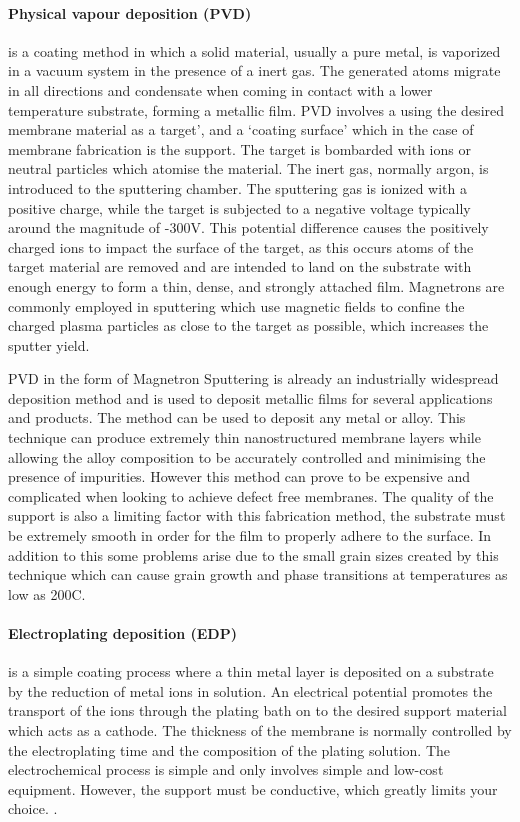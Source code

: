 \paragraph*{Physical vapour deposition (PVD)} is a coating method in which a solid material, usually a pure metal, is vaporized in a vacuum system in the presence of a inert gas. The generated atoms migrate in all directions and condensate when coming in contact with a lower temperature substrate,  forming a metallic film. PVD involves a using the desired membrane material as a target’, and a ‘coating surface’ which in the case of membrane fabrication is the support. \cite{Peters2015a} The target is bombarded with ions or neutral particles which atomise the material. The inert gas, normally argon, is introduced to the sputtering chamber. The sputtering gas is ionized with a positive charge, while the target is subjected to a negative voltage typically around the magnitude of -300V. This potential difference causes the positively charged ions to impact the surface of the target, as this occurs atoms of the target material are removed and are intended to land on the substrate with enough energy to form a thin, dense, and strongly attached film. Magnetrons are commonly employed in sputtering which use magnetic fields to confine the charged plasma particles as close to the target as possible, which increases the sputter yield. 

PVD in the form of Magnetron Sputtering is already an industrially widespread deposition method and is used to deposit metallic films for several applications and products. \cite{Peters2015a} The method can be used to deposit any metal or alloy. This technique can produce extremely thin nanostructured membrane layers while allowing the alloy composition to be accurately controlled and minimising the presence of impurities. \cite{Xomeritakis1997,McCool1999}  However this method can prove to be expensive and complicated when looking to achieve defect free membranes. \cite{Keurentjes2004} The quality of the support is also a limiting factor with this fabrication method, the substrate must be extremely smooth in order for the film to properly adhere to the surface.  In addition to this some problems arise due to the small grain sizes created by this technique which can cause grain growth and phase transitions at temperatures as low as 200\textdegree C. \cite{Bryden1995}

\paragraph*{Electroplating deposition (EDP)} is a simple coating process where a thin metal layer is deposited on a substrate by the reduction of metal ions in solution. An electrical potential promotes the transport of the ions through the plating bath on to the desired support material which acts as a cathode. The thickness of the membrane is normally controlled by the electroplating time and the composition of the plating solution. The electrochemical process is simple and only involves simple and low-cost equipment. However, the support must be conductive, which greatly limits your choice. \cite{Yun2011a, NathanW.Ockwig2007a}.

